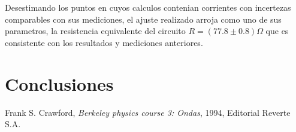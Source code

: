 \documentclass[11pt,a4paper]{article}
\begin{document}
Desestimando los puntos en cuyos calculos contenian corrientes con incertezas comparables con sus mediciones, el ajuste realizado arroja como uno de sus parametros, la resistencia equivalente del circuito $R = (77.8 \pm 0.8)\Omega$ que es consistente con los resultados y mediciones anteriores.


\section{Conclusiones}
\label{sec:conclusiones}








\begin{thebibliography}{1}
  Frank S. Crawford, \textit{Berkeley physics course 3: Ondas}, 1994, Editorial Reverte S.A.
\end{thebibliography}
 
\end{document}
